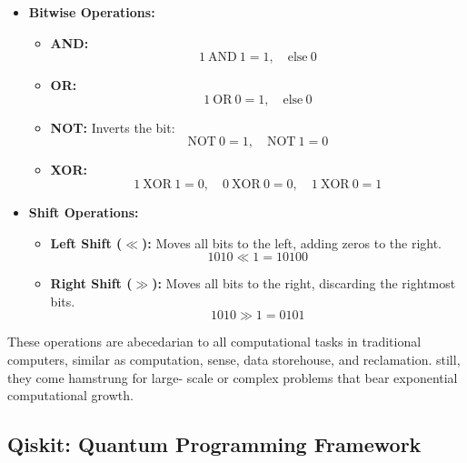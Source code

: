 \documentclass[conference]{IEEEtran}
\begin{document}
\begin{itemize}
    \item \textbf{Bitwise Operations:}
    \begin{itemize}
        \item \textbf{AND:} 
        \[
        1 \ \text{AND} \ 1 = 1, \quad \text{else} \ 0
        \]
        \item \textbf{OR:} 
        \[
        1 \ \text{OR} \ 0 = 1, \quad \text{else} \ 0
        \]
        \item \textbf{NOT:} Inverts the bit: 
        \[
        \text{NOT} \ 0 = 1, \quad \text{NOT} \ 1 = 0
        \]
        \item \textbf{XOR:} 
        \[
        1 \ \text{XOR} \ 1 = 0, \quad 0 \ \text{XOR} \ 0 = 0, \quad 1 \ \text{XOR} \ 0 = 1 
        \]
    \end{itemize}

    \item \textbf{Shift Operations:}
    \begin{itemize}
        \item \textbf{Left Shift ($\ll$):} Moves all bits to the left, adding zeros to the right.
        \[
        1010 \ll 1 = 10100
        \]
        \item \textbf{Right Shift ($\gg$):} Moves all bits to the right, discarding the rightmost bits.
        \[
        1010 \gg 1 = 0101
        \]
    \end{itemize}
\end{itemize}

These operations are abecedarian to all computational tasks in traditional computers, similar as computation, sense, data storehouse, and reclamation. still, they come hamstrung for large- scale or complex problems that bear exponential computational growth.

\subsection{Qiskit: Quantum Programming Framework}
\end{document}
